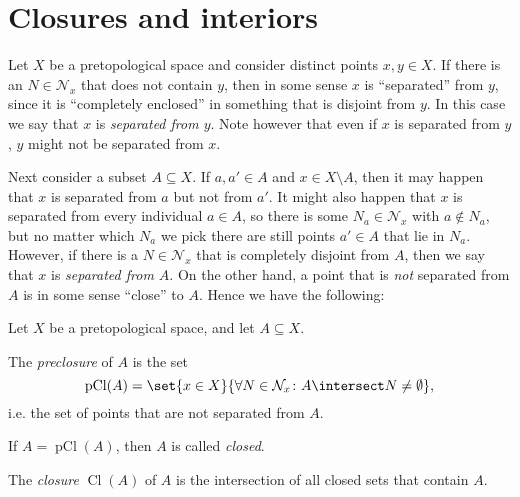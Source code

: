 \documentclass[article, a4paper, 11pt, oneside]{memoir}
\numberwithin{equation}{chapter}
\newcommand{\calN}{\mathcal{N}}
\newcommand{\nhoods}[1]{\calN_{#1}}
\newcommand{\pCl}[1]{\operatorname{pCl}(#1)}
\renewcommand{\closure}[1]{\operatorname{Cl}(#1)}
\begin{document}
\section{Closures and interiors}

Let $X$ be a pretopological space and consider distinct points $x,y \in X$. If there is an $N \in \nhoods{x}$ that does not contain $y$, then in some sense $x$ is \enquote{separated} from $y$, since it is \enquote{completely enclosed} in something that is disjoint from $y$. In this case we say that $x$ is \emph{separated from $y$}. Note however that even if $x$ is separated from $y$, $y$ might not be separated from $x$.

Next consider a subset $A \subseteq X$. If $a,a' \in A$ and $x \in X \setminus A$, then it may happen that $x$ is separated from $a$ but not from $a'$. It might also happen that $x$ is separated from every individual $a \in A$, so there is some $N_a \in \nhoods{x}$ with $a \not\in N_a$, but no matter which $N_a$ we pick there are still points $a' \in A$ that lie in $N_a$. However, if there is a $N \in \nhoods{x}$ that is completely disjoint from $A$, then we say that $x$ is \emph{separated from $A$}. On the other hand, a point that is \emph{not} separated from $A$ is in some sense \enquote{close} to $A$. Hence we have the following:

\begin{definition}
    Let $X$ be a pretopological space, and let $A \subseteq X$.
    \begin{enumdef}
        \item The \emph{preclosure} of $A$ is the set
        \begin{equation*}
            \pCl{A}
                = \set{x \in X}{\forall N \in \nhoods{x} \colon A \intersect N \neq \emptyset},
        \end{equation*}
        i.e. the set of points that are not separated from $A$.

        \item If $A = \pCl{A}$, then $A$ is called \emph{closed}.
        
        \item The \emph{closure} $\closure{A}$ of $A$ is the intersection of all closed sets that contain $A$.
    \end{enumdef}
\end{definition}
\end{document}

